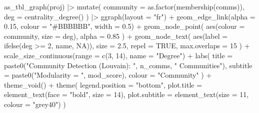 \documentclass[
  letterpaper,
  DIV=11,
  numbers=noendperiod]{scrartcl}
\newenvironment{Shaded}{\begin{snugshade}}{\end{snugshade}}
\newcommand{\AttributeTok}[1]{\textcolor[rgb]{0.40,0.45,0.13}{#1}}
\newcommand{\ConstantTok}[1]{\textcolor[rgb]{0.56,0.35,0.01}{#1}}
\newcommand{\DecValTok}[1]{\textcolor[rgb]{0.68,0.00,0.00}{#1}}
\newcommand{\FloatTok}[1]{\textcolor[rgb]{0.68,0.00,0.00}{#1}}
\newcommand{\FunctionTok}[1]{\textcolor[rgb]{0.28,0.35,0.67}{#1}}
\newcommand{\NormalTok}[1]{\textcolor[rgb]{0.00,0.23,0.31}{#1}}
\newcommand{\SpecialCharTok}[1]{\textcolor[rgb]{0.37,0.37,0.37}{#1}}
\newcommand{\StringTok}[1]{\textcolor[rgb]{0.13,0.47,0.30}{#1}}
\begin{document}
\begin{Shaded}
\begin{Highlighting}[]
\FunctionTok{as\_tbl\_graph}\NormalTok{(proj) }\SpecialCharTok{|\textgreater{}}
  \FunctionTok{mutate}\NormalTok{(}
    \AttributeTok{community =} \FunctionTok{as.factor}\NormalTok{(}\FunctionTok{membership}\NormalTok{(comms)),}
    \AttributeTok{deg       =} \FunctionTok{centrality\_degree}\NormalTok{()}
\NormalTok{  ) }\SpecialCharTok{|\textgreater{}}
  \FunctionTok{ggraph}\NormalTok{(}\AttributeTok{layout =} \StringTok{"fr"}\NormalTok{) }\SpecialCharTok{+}
  \FunctionTok{geom\_edge\_link}\NormalTok{(}\AttributeTok{alpha =} \FloatTok{0.15}\NormalTok{, }\AttributeTok{colour =} \StringTok{"\#BBBBBB"}\NormalTok{, }\AttributeTok{width =} \FloatTok{0.5}\NormalTok{) }\SpecialCharTok{+}
  \FunctionTok{geom\_node\_point}\NormalTok{(}
    \FunctionTok{aes}\NormalTok{(}\AttributeTok{colour =}\NormalTok{ community, }\AttributeTok{size =}\NormalTok{ deg),}
    \AttributeTok{alpha =} \FloatTok{0.85}
\NormalTok{  ) }\SpecialCharTok{+}
  \FunctionTok{geom\_node\_text}\NormalTok{(}
    \FunctionTok{aes}\NormalTok{(}\AttributeTok{label =} \FunctionTok{ifelse}\NormalTok{(deg }\SpecialCharTok{\textgreater{}=} \DecValTok{2}\NormalTok{, name, }\ConstantTok{NA}\NormalTok{)),}
    \AttributeTok{size =} \FloatTok{2.5}\NormalTok{, }\AttributeTok{repel =} \ConstantTok{TRUE}\NormalTok{, }\AttributeTok{max.overlaps =} \DecValTok{15}
\NormalTok{  ) }\SpecialCharTok{+}
  \FunctionTok{scale\_size\_continuous}\NormalTok{(}\AttributeTok{range =} \FunctionTok{c}\NormalTok{(}\DecValTok{3}\NormalTok{, }\DecValTok{14}\NormalTok{), }\AttributeTok{name =} \StringTok{"Degree"}\NormalTok{) }\SpecialCharTok{+}
  \FunctionTok{labs}\NormalTok{(}
    \AttributeTok{title   =} \FunctionTok{paste0}\NormalTok{(}\StringTok{"Community Detection (Louvain): "}\NormalTok{, n\_comms, }\StringTok{" Communities"}\NormalTok{),}
    \AttributeTok{subtitle =} \FunctionTok{paste0}\NormalTok{(}\StringTok{"Modularity = "}\NormalTok{, mod\_score),}
    \AttributeTok{colour  =} \StringTok{"Community"}
\NormalTok{  ) }\SpecialCharTok{+}
  \FunctionTok{theme\_void}\NormalTok{() }\SpecialCharTok{+}
  \FunctionTok{theme}\NormalTok{(}
    \AttributeTok{legend.position =} \StringTok{"bottom"}\NormalTok{,}
    \AttributeTok{plot.title    =} \FunctionTok{element\_text}\NormalTok{(}\AttributeTok{face =} \StringTok{"bold"}\NormalTok{, }\AttributeTok{size =} \DecValTok{14}\NormalTok{),}
    \AttributeTok{plot.subtitle =} \FunctionTok{element\_text}\NormalTok{(}\AttributeTok{size =} \DecValTok{11}\NormalTok{, }\AttributeTok{colour =} \StringTok{"grey40"}\NormalTok{)}
\NormalTok{  )}
\end{Highlighting}
\end{Shaded}
\end{document}
